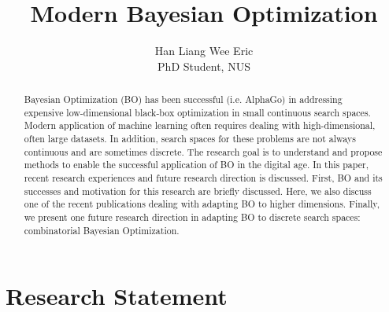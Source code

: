 \documentclass[
    american,a4paper
    ]{scrartcl}
\title{
        Modern Bayesian Optimization
        \\  \Large{\paperSubTitle{\lang}}} %
\author{
        Han Liang Wee Eric\\
        {\small PhD Student, NUS}
        }
\date{\formatdate{28}{04}{2021}}
\begin{document}
      \maketitle
        \begin{abstract}

            Bayesian Optimization (BO) has been successful (i.e. AlphaGo) in addressing expensive low-dimensional black-box optimization in small continuous search spaces. 
            Modern application of machine learning often requires dealing with high-dimensional, often large datasets. 
            In addition, search spaces for these problems are not always continuous and are sometimes discrete.
            The research goal is to understand and propose methods to enable the successful application of BO in the digital age.
            In this paper, recent research experiences and future research direction is discussed.
            First, BO and its successes and motivation for this research are briefly discussed.
            Here, we also discuss one of the recent publications dealing with adapting BO to higher dimensions.
            Finally, we present one future research direction in adapting BO to discrete search spaces: combinatorial Bayesian Optimization.

        \end{abstract}

        \section{Research Statement}
\end{document}
